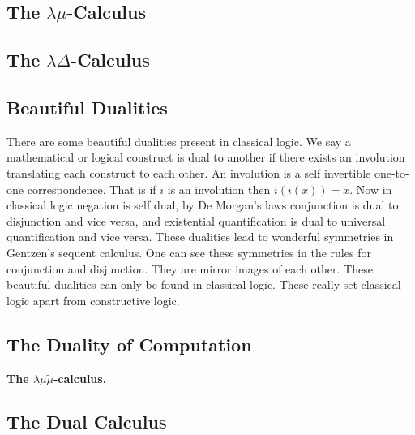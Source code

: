 \documentclass{article}
\newcommand{\LBMMT}[0]{\bar{\lambda}\mu\tilde\mu}
\begin{document}
\subsection{The $\lambda\mu$-Calculus}
\label{subsec:the_lambda-mu-calculus}


\subsection{The $\lambda\Delta$-Calculus}
\label{subsec:the_lambda-delta-calculus}


\subsection{Beautiful Dualities}
\label{subsec:beautiful_dualities}
There are some beautiful dualities present in classical logic.  We say
a mathematical or logical construct is dual to another if there exists
an involution translating each construct to each other.  An involution
is a self invertible one-to-one correspondence.  That is if $i$ is an
involution then $i(i(x)) = x$.  Now in classical logic negation is
self dual, by De Morgan's laws conjunction is dual to disjunction and
vice versa, and existential quantification is dual to universal
quantification and vice versa.  These dualities lead to wonderful
symmetries in Gentzen's sequent calculus.  One can see these
symmetries in the rules for conjunction and disjunction.  They are
mirror images of each other.  These beautiful dualities can only be
found in classical logic.  These really set classical logic apart from
constructive logic.

\subsection{The Duality of Computation}
\label{subsec:the_duality_of_computation}
\textbf{The $\LBMMT$-calculus.} 

\subsection{The Dual Calculus}
\label{subsec:the_dual_calculus}

\end{document}

